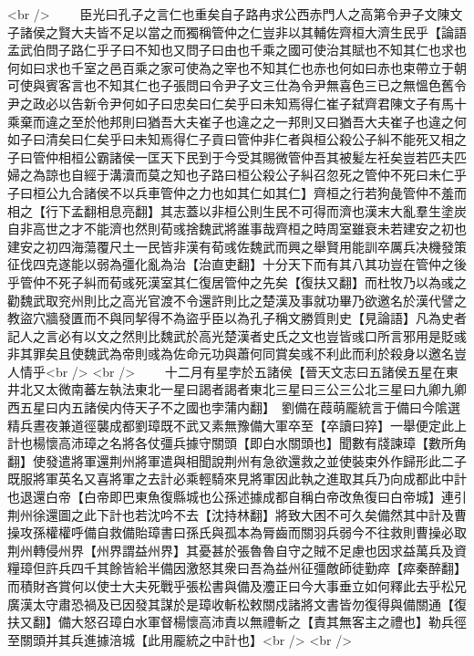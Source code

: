 <br />
　　臣光曰孔子之言仁也重矣自子路冉求公西赤門人之高第令尹子文陳文子諸侯之賢大夫皆不足以當之而獨稱管仲之仁豈非以其輔佐齊桓大濟生民乎【論語孟武伯問子路仁乎子曰不知也又問子曰由也千乘之國可使治其賦也不知其仁也求也何如曰求也千室之邑百乘之家可使為之宰也不知其仁也赤也何如曰赤也束帶立于朝可使與賓客言也不知其仁也子張問曰令尹子文三仕為令尹無喜色三已之無慍色舊令尹之政必以告新令尹何如子曰忠矣曰仁矣乎曰未知焉得仁崔子弑齊君陳文子有馬十乘棄而違之至於他邦則曰猶吾大夫崔子也違之之一邦則又曰猶吾大夫崔子也違之何如子曰清矣曰仁矣乎曰未知焉得仁子貢曰管仲非仁者與桓公殺公子糾不能死又相之子曰管仲相桓公霸諸侯一匡天下民到于今受其賜微管仲吾其被髪左衽矣豈若匹夫匹婦之為諒也自經于溝瀆而莫之知也子路曰桓公殺公子糾召忽死之管仲不死曰未仁乎子曰桓公九合諸侯不以兵車管仲之力也如其仁如其仁】齊桓之行若狗彘管仲不羞而相之【行下孟翻相息亮翻】其志蓋以非桓公則生民不可得而濟也漢末大亂羣生塗炭自非高世之才不能濟也然則荀彧捨魏武將誰事哉齊桓之時周室雖衰未若建安之初也建安之初四海蕩覆尺土一民皆非漢有荀彧佐魏武而興之舉賢用能訓卒厲兵决機發策征伐四克遂能以弱為彊化亂為治【治直吏翻】十分天下而有其八其功豈在管仲之後乎管仲不死子糾而荀彧死漢室其仁復居管仲之先矣【復扶又翻】而杜牧乃以為彧之勸魏武取兖州則比之高光官渡不令還許則比之楚漢及事就功畢乃欲邀名於漢代譬之教盜穴牆發匱而不與同挈得不為盜乎臣以為孔子稱文勝質則史【見論語】凡為史者記人之言必有以文之然則比魏武於高光楚漢者史氏之文也豈皆彧口所言邪用是貶彧非其罪矣且使魏武為帝則彧為佐命元功與蕭何同賞矣彧不利此而利於殺身以邀名豈人情乎<br />
<br />
　　十二月有星孛於五諸侯【晉天文志曰五諸侯五星在東井北又太微南蕃左執法東北一星曰謁者謁者東北三星曰三公三公北三星曰九卿九卿西五星曰内五諸侯内侍天子不之國也孛蒲内翻】　劉備在葭萌龎統言于備曰今隂選精兵晝夜兼道徑襲成都劉璋既不武又素無豫備大軍卒至【卒讀曰猝】一舉便定此上計也楊懷高沛璋之名將各仗彊兵據守關頭【即白水關頭也】聞數有牋諫璋【數所角翻】使發遣將軍還荆州將軍遣與相聞說荆州有急欲還救之並使裝束外作歸形此二子既服將軍英名又喜將軍之去計必乘輕騎來見將軍因此執之進取其兵乃向成都此中計也退還白帝【白帝即巴東魚復縣城也公孫述據成都自稱白帝改魚復曰白帝城】連引荆州徐還圖之此下計也若沈吟不去【沈持林翻】將致大困不可久矣備然其中計及曹操攻孫權權呼備自救備貽璋書曰孫氏與孤本為脣齒而關羽兵弱今不往救則曹操必取荆州轉侵州界【州界謂益州界】其憂甚於張魯魯自守之賊不足慮也因求益萬兵及資糧璋但許兵四千其餘皆給半備因激怒其衆曰吾為益州征彊敵師徒勤瘁【瘁秦醉翻】而積財吝賞何以使士大夫死戰乎張松書與備及灋正曰今大事垂立如何釋此去乎松兄廣漢太守肅恐禍及已因發其謀於是璋收斬松敕關戍諸將文書皆勿復得與備關通【復扶又翻】備大怒召璋白水軍督楊懷高沛責以無禮斬之【責其無客主之禮也】勒兵徑至關頭并其兵進據涪城【此用龎統之中計也】<br />
<br />

